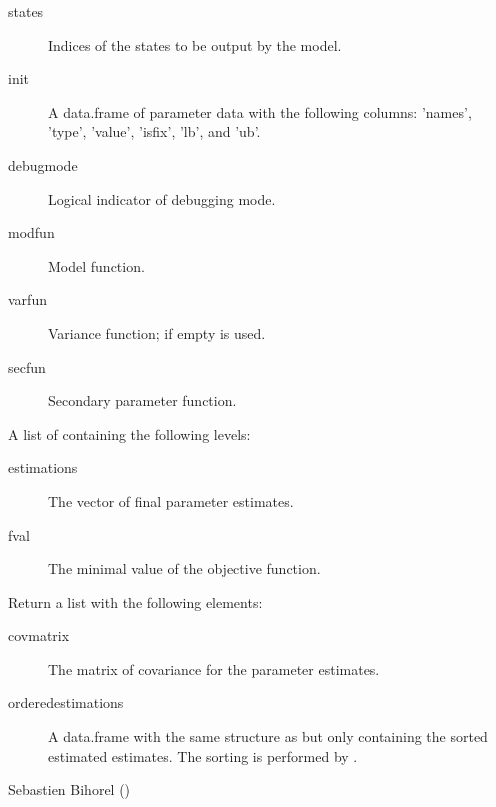 \begin{Arguments}
\begin{ldescription}
\begin{description}
\begin{description}
\end{description}

\item[states] Indices of the states to be output by the model.
\item[init] A data.frame of parameter data with the following columns:
'names', 'type', 'value', 'isfix', 'lb', and 'ub'.
\item[debugmode] Logical indicator of debugging mode.
\item[modfun] Model function.
\item[varfun] Variance function; if empty  is
used.
\item[secfun] Secondary parameter function.

\end{description}


\item[\code{Fit}] A list of containing the following levels:\begin{description}

\item[estimations] The vector of final parameter estimates.
\item[fval] The minimal value of the objective function.

\end{description}


\end{ldescription}
\end{Arguments}
%
\begin{Value}
Return a list with the following elements: \begin{description}

\item[covmatrix] The matrix of covariance for the parameter estimates.
\item[orderedestimations] A data.frame with the same structure as
 but only containing the sorted estimated estimates.
The sorting is performed by .

\end{description}

\end{Value}
%
\begin{Author}\relax
Sebastien Bihorel ()
\end{Author}
%
\begin{SeeAlso}\relax
{}
\end{SeeAlso}
